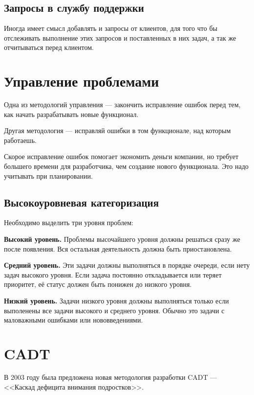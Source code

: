 \subsection{ Запросы в службу поддержки } \label{sect3_17_4}

Иногда имеет смысл добавлять и запросы от клиентов, для того что бы отслеживать выполнение этих запросов и поставленных в них задач, а так же отчитываться перед клиентом.

\section{ Управление проблемами } \label{sect3_18_1}


Одна из методологий управления --- закончить исправление ошибок перед тем, как начать разрабатывать новые функционал.

Другая методология --- исправляй ошибки в том функционале, над которым работаешь.

Скорое исправление ошибок помогает экономить деньги компании, но требует большего времени для разработчика, чем создание нового функционала. Это надо учитывать при планировании.

\subsection{ Высокоуровневая категоризация } \label{sect3_18_1}

Необходимо выделить три уровня проблем:

\textbf{Высокий уровень.} Проблемы высочайшего уровня должны решаться сразу же после появления. Вся остальная деятельность должна быть приостановлена.


\textbf{Средний уровень.} Эти задачи должны выполняться в порядке очереди, если нету задач высокого уровня. Если задача постоянно откладывается или теряет приоритет, её статус должен быть понижен до низкого уровня.

\textbf{Низкий уровень.} Задачи низкого уровня должны выполняться только если выполенены все задачи высокого и среднего уровня. Обычно это задачи с маловажными ошибками или нововведениями.

\section{ CADT } \label{sect3_19}

В 2003 году была предложена новая методология разработки CADT --- <<Каскад дефицита внимания подростков>>.

